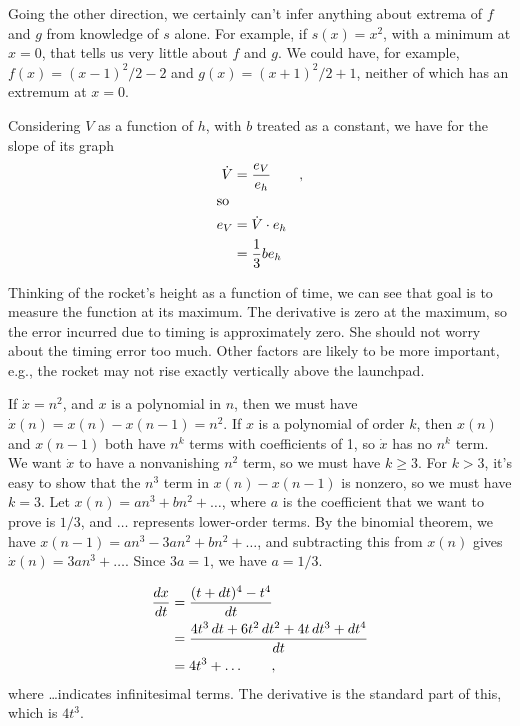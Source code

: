 Going the other direction, we certainly can't infer anything about extrema of $f$ and $g$ from knowledge of $s$ alone.
For example, if $s(x)=x^2$, with a minimum at $x=0$, that tells us very little about $f$ and $g$. We could have, for example,
$f(x)=(x-1)^2/2-2$ and $g(x)=(x+1)^2/2+1$, neither of which has an extremum at $x=0$.


Considering $V$ as a function of $h$, with $b$ treated as a constant, we have for the slope
of its graph
\begin{align*}
  \dot{V} &= \frac{e_V}{e_h} \qquad ,\\
\intertext{so}
  e_V &= \dot{V}\cdot e_h \\
      &= \frac{1}{3}b e_h
\end{align*}


Thinking of the rocket's height as a function of time, we can see that goal is to measure
the function at its maximum. The derivative is zero at the maximum, so the error incurred
due to timing is approximately zero. She should not worry about the timing error too much.
Other factors are likely to be more important, e.g., the rocket may not rise exactly
vertically above the launchpad.

If $\dot{x}=n^2$, and $x$ is a polynomial in $n$, then we must have
$\dot{x}(n)=x(n)-x(n-1)=n^2$. If $x$ is a polynomial of order $k$, then
$x(n)$ and $x(n-1)$ both have $n^k$ terms with coefficients of 1, so 
$\dot{x}$ has no $n^k$ term. We want $\dot{x}$ to have a nonvanishing $n^2$ term,
so we must have $k\ge 3$. For $k>3$, it's easy to show that the $n^3$ term in
$x(n)-x(n-1)$ is nonzero, so we must have $k=3$. Let $x(n)=an^3+bn^2+\ldots$, where
$a$ is the coefficient that we want to prove is $1/3$, and $\ldots$ represents
lower-order terms. By the binomial theorem, we have $x(n-1)=an^3-3an^2+bn^2+\ldots$,
and subtracting this from $x(n)$ gives $\dot{x}(n)=3an^3+\ldots$. Since $3a=1$,
we have $a=1/3$.



\begin{align*}
  \frac{\der x}{\der t} &= \frac{(t+\der t)^4-t^4}{\der t} \\
                        &= \frac{4t^3\der t + 6t^2\der t^2 + 4t\der t^3+\der t^4}{\der t} \\
                        &= 4t^3 + \ldots \qquad ,
\end{align*}
where \ldots indicates infinitesimal terms.
The derivative is the standard part of this, which is $4t^3$.

